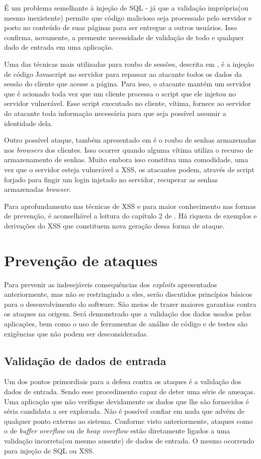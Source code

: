 			É um problema semelhante à injeção de SQL - já que a validação imprópria(ou mesmo inexistente)
			permite	que código malicioso seja processado pelo servidor e posto no conteúdo de suas páginas
			para ser entregue a outros usuários. Isso confirma, novamente, a premente necessidade de validação
			de todo e qualquer dado de entrada em uma aplicação. 

			
			Uma das técnicas mais utilizadas para roubo de sessões, descrita em \cite{Dhanjani2009}, é 
			a injeção de código Javascript no servidor para repassar ao atacante
			todos os dados da sessão do cliente que acesse a página. Para isso, o atacante mantém um servidor
			que é acionado toda vez que um cliente processa o script que ele injetou no servidor vulnerável.
			Esse script executado no cliente, vítima, fornece ao servidor do atacante toda informação
			necessária para que seja possível assumir a identidade dela.
			
			
			Outro possível ataque, também apresentado em \cite{Dhanjani2009} é o roubo de senhas armazenadas
			nos \textsl{browsers} dos clientes.	Isso ocorrer quando alguma vítima utiliza o recurso
			de armazenamento de senhas. Muito embora isso constitua uma comodidade, uma vez que o servidor
			esteja vulnerável a XSS, os atacantes podem, através de script forjado para fingir
			um login injetado no servidor, recuperar as senhas armazenadas \textsl{browser}. 


			Para aprofundamento nas técnicas de XSS e para maior conhecimento nas formas de prevenção,
			é aconselhável a leitura do capítulo 2 de \cite{Dhanjani2009}. Há riqueza de exemplos e
			derivações do XSS que constituem nova geração dessa forma de ataque.
			

	\section{Prevenção de ataques}
		Para prevenir as indesejáveis consequências dos \textsl{exploits} apresentados
		anteriormente, mas não se restringindo a eles, serão discutidos princípios básicos
		para o desenvolvimento do software. São meios de trazer maiores garantias contra os ataques
		na origem. Será demonstrado que a validação dos dados usados pelas aplicações, bem como
		o uso de ferramentas de análise de código e de testes são exigências que não podem
		ser desconsideradas. 

		
		\subsection{Validação de dados de entrada}
			Um dos pontos primordiais para a defesa contra os ataques é a validação dos dados de entrada.
			Sendo esse procedimento capaz de deter uma série de ameaças. Uma aplicação que não verifique
			devidamente os dados que lhe são fornecidos é séria candidata a ser explorada. Não é possível
			confiar em nada que advém de qualquer ponto externo ao sistema. Conforme visto anteriormente,
			ataques como o de \textsl{buffer overflow} ou de \textsl{heap overflow} estão diretamente
			ligados a uma validação incorreta(ou mesmo ausente) de dados de entrada. O mesmo ocorrendo
			para injeção de SQL ou XSS.


